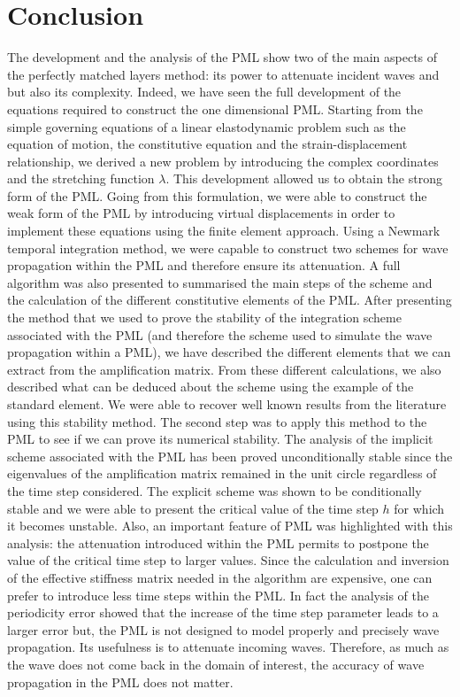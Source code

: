 \section*{Conclusion}

The development and the analysis of the PML show two of the main aspects of the perfectly matched layers method: its power to attenuate incident waves and but also its complexity. 
Indeed, we have seen the full development of the equations required to construct the one dimensional PML. Starting from the simple governing equations of a linear elastodynamic problem such as the equation of motion, the constitutive equation and the strain-displacement relationship, we derived a new problem by introducing the complex coordinates and the stretching function $\lambda$. This development allowed us to obtain the strong form of the PML. Going from this formulation, we were able to construct the weak form of the PML by introducing virtual displacements in order to implement these equations using the finite element approach. Using a Newmark temporal integration method, we were capable to construct two schemes for wave propagation within the PML and therefore ensure its attenuation. A full algorithm was also presented to summarised the main steps of the scheme and the calculation of the different constitutive elements of the PML.
After presenting the method that we used to prove the stability of the integration scheme associated with the PML (and therefore the scheme used to simulate the wave propagation within a PML), we have described the different elements that we can extract from the amplification matrix. From these different calculations, we also described what can be deduced about the scheme using the example of the standard element. We were able to recover well known results from the literature using this stability method. The second step was to apply this method to the PML to see if we can prove its numerical stability. 
The analysis of the implicit scheme associated with the PML has been proved unconditionally stable since the eigenvalues of the amplification matrix remained in the unit circle regardless of the time step considered. The explicit scheme was shown to be conditionally stable and we were able to present the critical value of the time step $h$ for which it becomes unstable. Also, an important feature of PML was highlighted with this analysis: the attenuation introduced within the PML permits to postpone the value of the critical time step to larger values. Since the calculation and inversion of the effective stiffness matrix needed in the algorithm are expensive, one can prefer to introduce less time steps within the PML. In fact the analysis of the periodicity error showed that the increase of the time step parameter leads to a larger error but, the PML is not designed to model properly and precisely wave propagation. Its usefulness is to attenuate incoming waves. Therefore, as much as the wave does not come back in the domain of interest, the accuracy of wave propagation in the PML does not matter.\\
